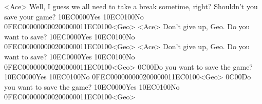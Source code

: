 <Ace> Well, I guess we all need to take a break sometime, right? 
Shouldn't you save your game? {10}{EC}{00}{00}Yes {10}{EC}{01}{00}No {0F}{EC}{00}{00}{00}{00}{02}{00}{00}{00}{11}{EC}{01}{00}<Geo>
<Ace> Don't give up, Geo. 
Do you want to save? {10}{EC}{00}{00}Yes {10}{EC}{01}{00}No {0F}{EC}{00}{00}{00}{00}{02}{00}{00}{00}{11}{EC}{01}{00}<Geo>
<Ace> Don't give up, Geo. 
Do you want to save? {10}{EC}{00}{00}Yes {10}{EC}{01}{00}No {0F}{EC}{00}{00}{00}{00}{02}{00}{00}{00}{11}{EC}{01}{00}<Geo>
{0C}{00}Do you want to save the game? {10}{EC}{00}{00}Yes {10}{EC}{01}{00}No {0F}{EC}{00}{00}{00}{00}{02}{00}{00}{00}{11}{EC}{01}{00}<Geo>
{0C}{00}Do you want to save the game? {10}{EC}{00}{00}Yes {10}{EC}{01}{00}No {0F}{EC}{00}{00}{00}{00}{02}{00}{00}{00}{11}{EC}{01}{00}<Geo>
